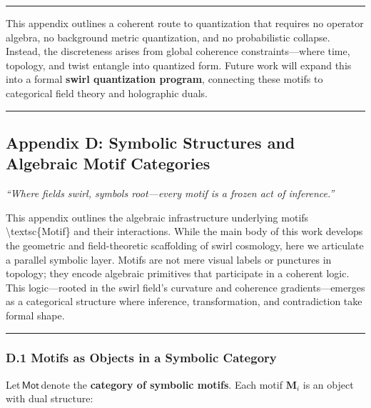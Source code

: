 \documentclass[
  11pt,
]{article}
\begin{document}
\begin{center}\rule{0.5\linewidth}{0.5pt}\end{center}

This appendix outlines a coherent route to quantization that requires no
operator algebra, no background metric quantization, and no
probabilistic collapse. Instead, the discreteness arises from global
coherence constraints---where time, topology, and twist entangle into
quantized form. Future work will expand this into a formal \textbf{swirl
quantization program}, connecting these motifs to categorical field
theory and holographic duals.

\begin{center}\rule{0.5\linewidth}{0.5pt}\end{center}

\subsection{\texorpdfstring{\textbf{Appendix D: Symbolic Structures and
Algebraic Motif
Categories}}{Appendix D: Symbolic Structures and Algebraic Motif Categories}}\label{appendix-d-symbolic-structures-and-algebraic-motif-categories}

\emph{``Where fields swirl, symbols root---every motif is a frozen act
of inference.''}

This appendix outlines the algebraic infrastructure underlying motifs
\textbackslash textsc\{Motif\} and their interactions. While the main
body of this work develops the geometric and field-theoretic scaffolding
of swirl cosmology, here we articulate a parallel symbolic layer. Motifs
are not mere visual labels or punctures in topology; they encode
algebraic primitives that participate in a coherent logic. This
logic---rooted in the swirl field's curvature and coherence
gradients---emerges as a categorical structure where inference,
transformation, and contradiction take formal shape.

\begin{center}\rule{0.5\linewidth}{0.5pt}\end{center}

\subsubsection{\texorpdfstring{\textbf{D.1 Motifs as Objects in a
Symbolic
Category}}{D.1 Motifs as Objects in a Symbolic Category}}\label{d.1-motifs-as-objects-in-a-symbolic-category}

Let\,\(\mathsf{Mot}\)\,denote the \textbf{category of symbolic motifs}.
Each motif \(\mathbf{M}_i\) is an object with dual structure:
\end{document}
